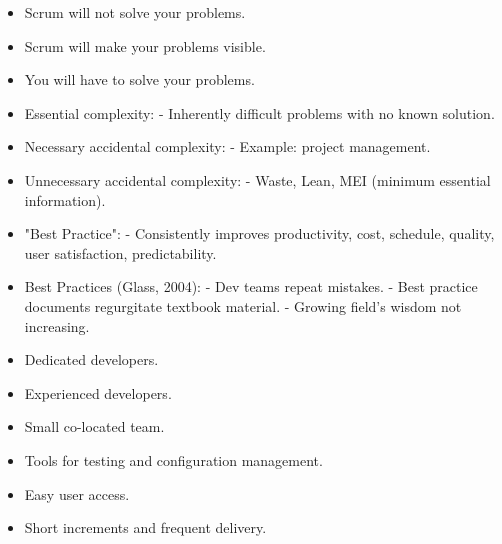 \documentclass[10pt]{article}
\begin{document}
\begin{multicols}{5}
\begin{block}
    \begin{itemize}
        \item Scrum will not solve your problems.
        \item Scrum will make your problems visible.
        \item You will have to solve your problems.
    \end{itemize}
\end{block}


\begin{block}
\begin{itemize}
  \item Essential complexity:
    - Inherently difficult problems with no known solution.
  \item Necessary accidental complexity:
    - Example: project management.
  \item Unnecessary accidental complexity:
    - Waste, Lean, MEI (minimum essential information).
\end{itemize}
\end{block}

\begin{block}
\begin{itemize}
  \item "Best Practice":
    - Consistently improves productivity, cost, schedule, quality, user satisfaction, predictability.
  \item Best Practices (Glass, 2004):
    - Dev teams repeat mistakes.
    - Best practice documents regurgitate textbook material.
    - Growing field's wisdom not increasing.
\end{itemize}
\end{block}


\begin{block}
\begin{itemize}
  \item Dedicated developers.
  \item Experienced developers.
  \item Small co-located team.
  \item Tools for testing and configuration management.
  \item Easy user access.
  \item Short increments and frequent delivery.
\end{itemize}
\end{block}


\end{multicols}
\end{document}

